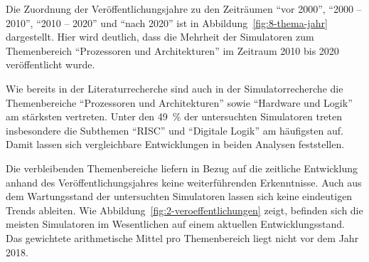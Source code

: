 Die Zuordnung der Veröffentlichungsjahre zu den Zeiträumen \enquote{vor 2000}, \enquote{2000 -- 2010}, \enquote{2010 -- 2020} und \enquote{nach 2020} ist in Abbildung~\ref{fig:8-thema-jahr} dargestellt. Hier wird deutlich, dass die Mehrheit der Simulatoren zum Themenbereich \enquote{Prozessoren und Architekturen} im Zeitraum 2010 bis 2020 veröffentlicht wurde.

Wie bereits in der Literaturrecherche sind auch in der Simulatorrecherche die Themenbereiche \enquote{Prozessoren und Architekturen} sowie \enquote{Hardware und Logik} am stärksten vertreten. Unter den 49~\% der untersuchten Simulatoren treten insbesondere die Subthemen \enquote{RISC} und \enquote{Digitale Logik} am häufigsten auf. Damit lassen sich vergleichbare Entwicklungen in beiden Analysen feststellen.

Die verbleibenden Themenbereiche liefern in Bezug auf die zeitliche Entwicklung anhand des Veröffentlichungsjahres keine weiterführenden Erkenntnisse. Auch aus dem Wartungsstand der untersuchten Simulatoren lassen sich keine eindeutigen Trends ableiten. Wie Abbildung~\ref{fig:2-veroeffentlichungen} zeigt, befinden sich die meisten Simulatoren im Wesentlichen auf einem aktuellen Entwicklungsstand. Das gewichtete arithmetische Mittel pro Themenbereich liegt nicht vor dem Jahr 2018.


